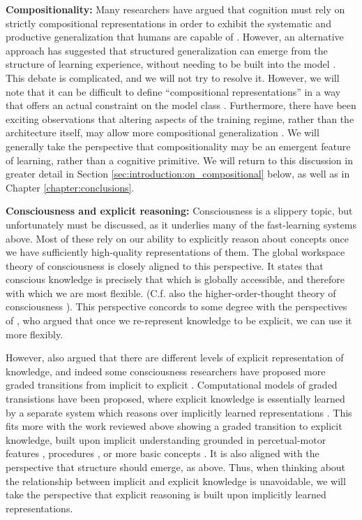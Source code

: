 \textbf{Compositionality:} Many researchers have argued that cognition must rely on strictly compositional representations in order to exhibit the systematic and productive generalization that humans are capable of \citep[e.g.][]{Fodor2001, Fodor2008lot2, Lake2017}. However, an alternative approach has suggested that structured generalization can emerge from the structure of learning experience, without needing to be built into the model \citep{McClelland2010, Hansen2017}. This debate is complicated, and we will not try to resolve it. However, we will note that it can be difficult to define ``compositional representations'' in a way that offers an actual constraint on the model class \citep[c.f.][]{Zadrozny1992}. Furthermore, there have been exciting observations that altering aspects of the training regime, rather than the architecture itself, may allow more compositional generalization \citep{Hill2019a}. We will generally take the perspective that compositionality may be an emergent feature of learning, rather than a cognitive primitive. We will return to this discussion in greater detail in Section \ref{sec:introduction:on_compositional} below, as well as in Chapter \ref{chapter:conclusions}.\par
\textbf{Consciousness and explicit reasoning:} Consciousness is a slippery topic, but unfortunately must be discussed, as it underlies many of the fast-learning systems above. Most of these rely on our ability to explicitly reason about concepts once we have sufficiently high-quality representations of them. The global workspace theory of consciousness \citep{Baars2005, Dehaene2017} is closely aligned to this perspective. It states that conscious knowledge is precisely that which is globally accessible, and therefore with which we are most flexible. (C.f. also the higher-order-thought theory of consciousness \citep{Rosenthal1990}). This perspective concords to some degree with the perspectives of \citet{Karmiloff-Smith1986}, who argued that once we re-represent knowledge to be explicit, we can use it more flexibly. \par
However, \citet{Karmiloff-Smith1986} also argued that there are different levels of explicit representation of knowledge, and indeed some consciousness researchers have proposed more graded transitions from implicit to explicit \citep[e.g.][]{Cleeremans2002}. Computational models of graded transistions have been proposed, where explicit knowledge is essentially learned by a separate system which reasons over implicitly learned representations \citep{Cleeremans2014}. This fits more with the work reviewed above showing a graded transition to explicit knowledge, built upon implicit understanding grounded in percetual-motor features \citep[e.g.][]{Goldin-Meadow1993}, procedures \citep[e.g.][]{Hazzan1999}, or more basic concepts \citep{Wilensky1991, Patel2018}. It is also aligned with the perspective that structure should emerge, as above. Thus, when thinking about the relationship between implicit and explicit knowledge is unavoidable, we will take the perspective that explicit reasoning is built upon implicitly learned representations. \par 
